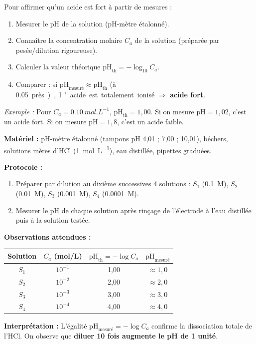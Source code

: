 \documentclass[11pt]{article}
\begin{document}
\begin{methode}
Pour affirmer qu'un acide est fort à partir de mesures :
\begin{enumerate}
  \item Mesurer le pH de la solution (pH-mètre étalonné).
  \item Connaître la concentration molaire $C_a$ de la solution (préparée par pesée/dilution rigoureuse).
  \item Calculer la valeur théorique $\mathrm{pH}_{\text{th}} = -\log_{10} C_a$.
  \item Comparer : si $\mathrm{pH}_{\text{mesuré}} \approx \mathrm{pH}_{\text{th}}$ (à \SI{0,05} près), l'acide est totalement ionisé $\Rightarrow$ \textbf{acide fort}.
\end{enumerate}
\emph{Exemple :} Pour $C_a = \SI{0,10}{mol.L^{-1}}$, $\mathrm{pH}_{\text{th}} = 1,00$. Si on mesure $\mathrm{pH} = 1,02$, c'est un acide fort. Si on mesure $\mathrm{pH} = 1,8$, c'est un acide faible.
\end{methode}

\begin{experience}
\textbf{Matériel :} pH-mètre étalonné (tampons pH 4,01 ; 7,00 ; 10,01), béchers, solutions mères d'HCl (\SI{1}{mol.L^{-1}}), eau distillée, pipettes graduées.
\par
\textbf{Protocole :}
\begin{enumerate}
  \item Préparer par dilution au dixième successives 4 solutions : $S_1$ (\SI{0,1}{M}), $S_2$ (\SI{0,01}{M}), $S_3$ (\SI{0,001}{M}), $S_4$ (\SI{0,0001}{M}).
  \item Mesurer le pH de chaque solution après rinçage de l'électrode à l'eau distillée puis à la solution testée.
\end{enumerate}
\textbf{Observations attendues :}
\begin{center}
\begin{tabular}{|c|c|c|c|}
\hline
Solution & $C_a$ (mol/L) & $\mathrm{pH}_{\text{th}} = -\log C_a$ & $\mathrm{pH}_{\text{mesuré}}$ \\
\hline
$S_1$ & $10^{-1}$ & 1,00 & $\approx 1,0$ \\
$S_2$ & $10^{-2}$ & 2,00 & $\approx 2,0$ \\
$S_3$ & $10^{-3}$ & 3,00 & $\approx 3,0$ \\
$S_4$ & $10^{-4}$ & 4,00 & $\approx 4,0$ \\
\hline
\end{tabular}
\end{center}
\textbf{Interprétation :} L'égalité $\mathrm{pH}_{\text{mesuré}} = -\log C_a$ confirme la dissociation totale de l'HCl. On observe que \textbf{diluer 10 fois augmente le pH de 1 unité}.
\end{experience}
\end{document}
